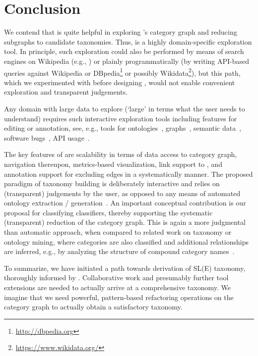 
\section{Conclusion}
\label{S:concl}

We contend that \WikiTax{} is quite helpful in exploring \Wikipedia's category graph and reducing subgraphs to candidate taxonomies. Thus, \WikiTax{} is a highly domain-specific exploration tool. In principle, such exploration could also be performed by means of search engines on Wikipedia (e.g., \cite{MilneW11a}) or plainly programmatically (by writing API-based queries against Wikipedia or DBpedia\footnote{\url{http://dbpedia.org}} or possibly Wikidata\footnote{\url{https://www.wikidata.org/}}), but this path, which we experimented with before designing \WikiTax, would not enable convenient exploration and transparent judgements.

Any domain with large data to explore (`large' in terms what the user needs to understand) requires such interactive exploration tools including features for editing or annotation, see, e.g., tools for ontologies~\cite{BaskayaKJ10}, graphs~\cite{HaunNKTB10}, semantic data~\cite{DumasBHS12}, software bugs~\cite{HoraADBCVM12}, API usage~\cite{RooverLP13}.

The key features of \WikiTax{} are scalability in terms of data access to \Wikipedia{} category graph, navigation thereupon, metrics-based visualization, link support to \Wikipedia, and annotation support for excluding edges in a systematically manner. The proposed paradigm of taxonomy building is deliberately interactive and relies on (transparent) judgements by the user, as opposed to any means of automated ontology extraction / generation~\cite{WuW08,SuchanekKW08}. An important conceptual contribution is our proposal for classifying classifiers, thereby supporting the systematic (transparent) reduction of the category graph. This is again a more judgmental than automatic approach, when compared to related work on taxonomy or ontology mining, where categories are also classified and additional relationships are inferred, e.g., by analyzing the structure of compound category names~\cite{NastaseS08}.

To summarize, we have initiated a path towards derivation of SL(E) taxonomy, thoroughly informed by \Wikipedia. Collaborative work and presumably further tool extensions are needed to actually arrive at a comprehensive taxonomy. We imagine that we need powerful, pattern-based refactoring operations on the category graph to actually obtain a satisfactory taxonomy.

